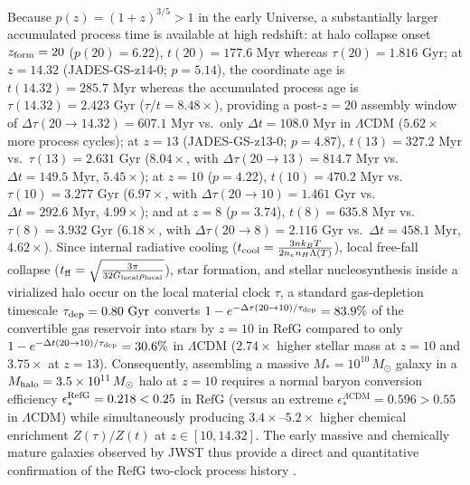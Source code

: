 \documentclass[11pt,a4paper]{article}
\newcommand{\RefG}{\mathrm{RefG}}
\begin{document}
Because $p(z) = (1+z)^{3/5} > 1$ in the early Universe, a substantially larger accumulated process time is available at high redshift: at halo collapse onset $z_{\rm form} = 20$ ($p(20) = 6.22$), $t(20) = 177.6\text{ Myr}$ whereas $\tau(20) = 1.816\text{ Gyr}$; at $z = 14.32$ (JADES-GS-z14-0; $p = 5.14$), the coordinate age is $t(14.32) = 285.7\text{ Myr}$ whereas the accumulated process age is \textbf{$\tau(14.32) = 2.423\text{ Gyr}$} ($\tau/t = 8.48\times$), providing a post-$z=20$ assembly window of $\Delta\tau(20\to 14.32) = 607.1\text{ Myr}$ vs.\ only $\Delta t = 108.0\text{ Myr}$ in $\Lambda$CDM ($5.62\times$ more process cycles); at $z = 13$ (JADES-GS-z13-0; $p = 4.87$), $t(13) = 327.2\text{ Myr}$ vs.\ \textbf{$\tau(13) = 2.631\text{ Gyr}$} ($8.04\times$, with $\Delta\tau(20\to 13) = 814.7\text{ Myr}$ vs.\ $\Delta t = 149.5\text{ Myr}$, $5.45\times$); at $z = 10$ ($p = 4.22$), $t(10) = 470.2\text{ Myr}$ vs.\ \textbf{$\tau(10) = 3.277\text{ Gyr}$} ($6.97\times$, with $\Delta\tau(20\to 10) = 1.461\text{ Gyr}$ vs.\ $\Delta t = 292.6\text{ Myr}$, $4.99\times$); and at $z = 8$ ($p = 3.74$), $t(8) = 635.8\text{ Myr}$ vs.\ \textbf{$\tau(8) = 3.932\text{ Gyr}$} ($6.18\times$, with $\Delta\tau(20\to 8) = 2.116\text{ Gyr}$ vs.\ $\Delta t = 458.1\text{ Myr}$, $4.62\times$). Since internal radiative cooling ($t_{\rm cool} = \frac{3 n k_B T}{2 n_e n_H\Lambda(T)}$), local free-fall collapse ($t_{\rm ff} = \sqrt{\frac{3\pi}{32 G_{\rm local}\rho_{\rm local}}}$), star formation, and stellar nucleosynthesis inside a virialized halo occur on the local material clock $\tau$, a standard gas-depletion timescale $\tau_{\rm dep} = 0.80\text{ Gyr}$ converts $1 - e^{-\Delta\tau(20\to 10)/\tau_{\rm dep}} = 83.9\%$ of the convertible gas reservoir into stars by $z = 10$ in $\RefG$ compared to only $1 - e^{-\Delta t(20\to 10)/\tau_{\rm dep}} = 30.6\%$ in $\Lambda$CDM ($2.74\times$ higher stellar mass at $z=10$ and $3.75\times$ at $z=13$). Consequently, assembling a massive $M_* = 10^{10}\,M_\odot$ galaxy in a $M_{\rm halo} = 3.5\times 10^{11}\,M_\odot$ halo at $z = 10$ requires a normal baryon conversion efficiency $\epsilon_*^{\rm RefG} = 0.218 < 0.25$ in $\RefG$ (versus an extreme $\epsilon_*^{\Lambda\text{CDM}} = 0.596 > 0.55$ in $\Lambda$CDM) while simultaneously producing $3.4\times\text{--}5.2\times$ higher chemical enrichment $Z(\tau)/Z(t)$ at $z \in [10, 14.32]$. The early massive and chemically mature galaxies observed by JWST thus provide a direct and quantitative confirmation of the $\RefG$ two-clock process history \citep{labbe2023}.
\end{document}
